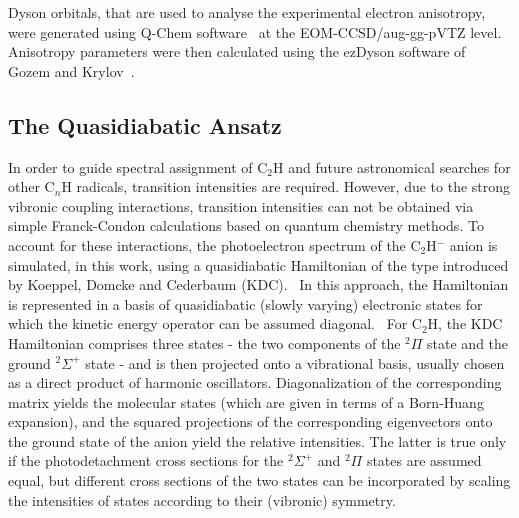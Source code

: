 \documentclass[aip,graphicx]{revtex4-1}
\begin{document}
Dyson orbitals, that are used to analyse the experimental electron anisotropy, were generated using Q-Chem software~\cite{sha15} at the EOM-CCSD/aug-gg-pVTZ level. Anisotropy parameters were then calculated using the ezDyson software of Gozem and Krylov~\cite{goz22}.

\subsection{The Quasidiabatic Ansatz} 
In order to guide spectral assignment of C$_2$H and future astronomical searches for other C$_n$H radicals, transition intensities are required. However, due to the strong vibronic coupling interactions, transition intensities can not be obtained via simple Franck-Condon calculations based on quantum chemistry methods. To account for these interactions, the photoelectron spectrum of the C$_2$H$^-$ anion is simulated, in this work, using a quasidiabatic Hamiltonian of the type introduced by Koeppel, Domcke and Cederbaum (KDC).~\cite{kou84,dom81} In this approach, the Hamiltonian is represented in a basis of quasidiabatic (slowly varying) electronic  states for which the kinetic energy operator can be assumed diagonal.~\cite{pac93} For C$_2$H, the KDC Hamiltonian comprises three states - the two components of the $^2\Pi$ state and the ground $^2\Sigma^+$ state - and is then projected onto a vibrational basis, usually chosen as a direct product of harmonic oscillators. Diagonalization of the corresponding matrix yields the molecular states (which are given in terms of a Born-Huang expansion), and the squared projections of the corresponding eigenvectors onto the ground state of the anion yield the relative intensities. The latter is true only if the photodetachment cross sections for the $^2\Sigma^+$ and $^2\Pi$ states are assumed equal, but different cross sections of the two states can be incorporated by scaling the intensities of states according to their (vibronic) symmetry.~\cite{sta11} 
\end{document}
